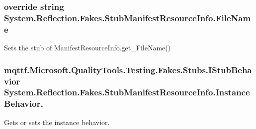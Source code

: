 \hypertarget{class_system_1_1_reflection_1_1_fakes_1_1_stub_manifest_resource_info_a561db7fa648e7de739a96823a07d5f7d}{
\subsubsection[{File\-Name}]{\setlength{\rightskip}{0pt plus 5cm}override string System.\-Reflection.\-Fakes.\-Stub\-Manifest\-Resource\-Info.\-File\-Name\hspace{0.3cm}{\ttfamily [get]}}}\label{class_system_1_1_reflection_1_1_fakes_1_1_stub_manifest_resource_info_a561db7fa648e7de739a96823a07d5f7d}


Sets the stub of Manifest\-Resource\-Info.\-get\-\_\-\-File\-Name()

\hypertarget{class_system_1_1_reflection_1_1_fakes_1_1_stub_manifest_resource_info_a541adc80ae9444b18110677e1c439473}{
\subsubsection[{Instance\-Behavior}]{\setlength{\rightskip}{0pt plus 5cm}mqttf.\-Microsoft.\-Quality\-Tools.\-Testing.\-Fakes.\-Stubs.\-I\-Stub\-Behavior System.\-Reflection.\-Fakes.\-Stub\-Manifest\-Resource\-Info.\-Instance\-Behavior\hspace{0.3cm}{\ttfamily [get]}, {\ttfamily [set]}}}\label{class_system_1_1_reflection_1_1_fakes_1_1_stub_manifest_resource_info_a541adc80ae9444b18110677e1c439473}


Gets or sets the instance behavior.

